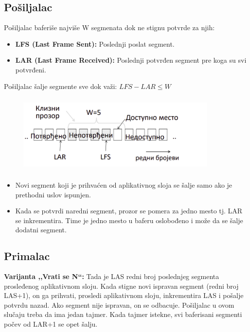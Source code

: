 \documentclass[a4paper]{article}
\begin{document}
    \subsection{Pošiljalac}
        \noindent Pošiljalac baferiše najviše W segmenata dok ne stignu potvrde za njih:
        \begin{itemize}
            \item \textbf{LFS (Last Frame Sent):} Poslednji poslat segment.
            \item \textbf{LAR (Last Frame Received):} Poslednji potvrđen segment pre koga su svi potvrđeni.
        \end{itemize}
        Pošiljalac šalje segmente sve dok važi: $LFS - LAR \leq W$
        \begin{figure}[H]
            \begin{center}
                \includegraphics[width=100mm,height=40mm]{Slike/tps_klizni_prozori.png}
            \end{center}
        \end{figure}
        \begin{itemize}
            \item Novi segment koji je prihvaćen od aplikativnog sloja se šalje samo ako
                  je prethodni uslov ispunjen. 
            \item Kada se potvrdi naredni segment, prozor se pomera za jedno mesto tj. LAR se
                  inkrementira. Time je jedno mesto u baferu oslobođeno i može da se šalje
                  dodatni segment. 
        \end{itemize}

    \subsection{Primalac}
        \textbf{Varijanta ,,Vrati se N``:} Tada je LAS redni broj poslednjeg segmenta prosleđenog
        aplikativnom sloju. Kada stigne novi ispravan segment (redni broj LAS+1), on ga prihvati, 
        prosledi aplikativnom sloju, inkrementira LAS i pošalje potvrdu nazad. Ako segment nije
        ispravan, on se odbacuje. Pošiljalac u ovom slučaju treba da ima jedan tajmer.
        Kada tajmer istekne, svi baferisani segmenti počev od LAR+1 se opet šalju. \\
\end{document}
